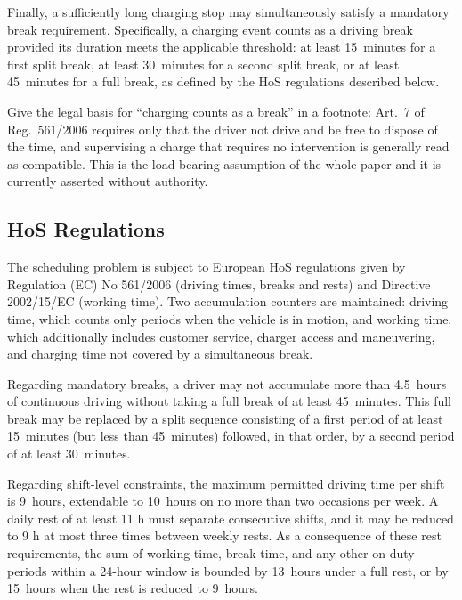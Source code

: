 Finally, a sufficiently long charging stop may simultaneously satisfy a mandatory break requirement. Specifically, a charging event counts as a driving break provided its duration meets the applicable threshold: at least 15~minutes for a first split break, at least 30~minutes for a second split break, or at least 45~minutes for a full break, as defined by the HoS regulations described below.

\begin{atodo}
Give the legal basis for ``charging counts as a break'' in a footnote: Art.~7 of
Reg.~561/2006 requires only that the driver not drive and be free to dispose of
the time, and supervising a charge that requires no intervention is generally
read as compatible. This is the load-bearing assumption of the whole paper and it
is currently asserted without authority.
\end{atodo}

\subsection{HoS Regulations}
The scheduling problem is subject to European HoS regulations given by Regulation (EC) No 561/2006 (driving times, breaks and rests) and Directive 2002/15/EC (working time). 
Two accumulation counters are maintained: driving time, which counts only periods when the vehicle is in motion, and working time, which additionally includes customer service, charger access and maneuvering, and charging time not covered by a simultaneous break.

Regarding mandatory breaks, a driver may not accumulate more than 4.5~hours of continuous driving without taking a full break of at least 45~minutes. This full break may be replaced by a split sequence consisting of a first period of at least 15~minutes (but less than 45~minutes) followed, in that order, by a second period of at least 30~minutes.

Regarding shift-level constraints, the maximum permitted driving time per shift is 9~hours, extendable to 10~hours on no more than two occasions per week.
A daily rest of at least 11 h must separate consecutive shifts, and it may be reduced to 9 h at most three times between weekly rests.
As a consequence of these rest requirements, the sum of working time, break time, and any other on-duty periods within a 24-hour window is bounded by 13~hours under a full rest, or by 15~hours when the rest is reduced to 9~hours.

